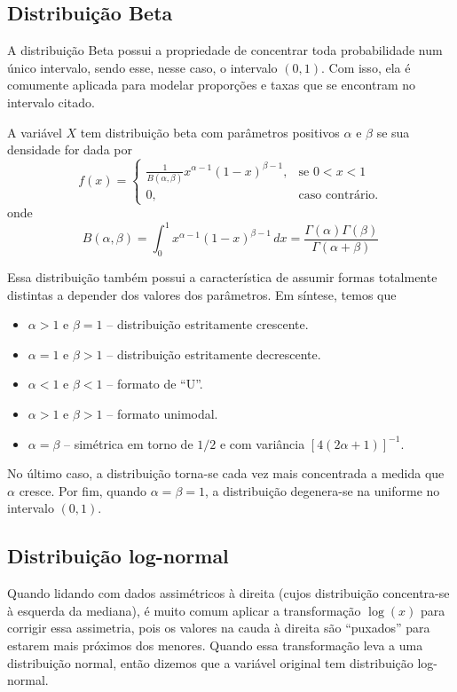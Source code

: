 \subsection{Distribuição Beta}

A distribuição Beta possui a propriedade de concentrar toda probabilidade num único
intervalo, sendo esse, nesse caso, o intervalo $(0, 1)$.
Com isso, ela é comumente aplicada para modelar proporções e taxas que se encontram
no intervalo citado.

\begin{def:beta}
A variável $X$ tem distribuição beta com parâmetros positivos $\alpha$ e $\beta$ se sua densidade
for dada por
\[
    f(x) = \begin{cases}
        \frac{1}{B(\alpha, \beta)} x^{\alpha-1} (1-x)^{\beta-1},&\text{se } 0 < x < 1 \\
        0,&\text{caso contrário.}
    \end{cases}
\]
onde
\[
    B(\alpha, \beta) = \int_0^1 x^{\alpha - 1} (1-x)^{\beta-1}\,dx = \frac{\Gamma(\alpha)\Gamma(\beta)}{\Gamma(\alpha+\beta)}
\]
\end{def:beta}

Essa distribuição também possui a característica de assumir formas totalmente distintas
a depender dos valores dos parâmetros.
Em síntese, temos que
\begin{itemize}
\item $\alpha > 1$ e $\beta = 1$ -- distribuição estritamente crescente.
\item $\alpha = 1$ e $\beta > 1$ -- distribuição estritamente decrescente.
\item $\alpha < 1$ e $\beta < 1$ -- formato de ``U''.
\item $\alpha > 1$ e $\beta > 1$ -- formato unimodal.
\item $\alpha = \beta$ -- simétrica em torno de $1/2$ e com variância $[4(2\alpha+1)]^{-1}$.
\end{itemize}

No último caso, a distribuição torna-se cada vez mais concentrada a medida que $\alpha$
cresce.
Por fim, quando $\alpha = \beta = 1$, a distribuição degenera-se na uniforme no intervalo
$(0, 1)$.

\subsection{Distribuição log-normal}

Quando lidando com dados assimétricos à direita (cujos distribuição concentra-se à
esquerda da mediana), é muito comum aplicar a transformação $\log(x)$ para corrigir
essa assimetria, pois os valores na cauda à direita são ``puxados'' para estarem
mais próximos dos menores.
Quando essa transformação leva a uma distribuição normal, então dizemos que a variável
original tem distribuição log-normal.

